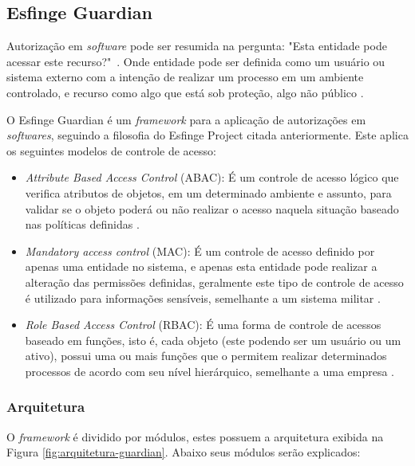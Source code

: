 \subsection{Esfinge Guardian}

\par Autorização em \textit{software} pode ser resumida na pergunta: "Esta entidade pode acessar este recurso?"\ \cite{sandhu1994access}. Onde entidade pode ser definida como um usuário ou sistema externo com a intenção de realizar um processo em um ambiente controlado, e recurso como algo que está sob proteção, algo não público \cite{bartsch2011authorization}.
\par O Esfinge Guardian é um \textit{framework} para a aplicação de autorizações em \textit{softwares}, seguindo a filosofia do Esfinge Project citada anteriormente. Este aplica os seguintes modelos de controle de acesso:

\begin{itemize}
    \item \textit{Attribute Based Access Control} (ABAC): É um controle de acesso lógico que verifica atributos de objetos, em um determinado ambiente e assunto, para validar se o objeto poderá ou não realizar o acesso naquela situação baseado nas políticas definidas \cite{hu2015attribute}.
    
    \item \textit{Mandatory access control} (MAC): É um controle de acesso definido por apenas uma entidade no sistema, e apenas esta entidade pode realizar a alteração das permissões definidas, geralmente este tipo de controle de acesso é utilizado para informações sensíveis, semelhante a um sistema militar \cite{lindqvist2006mandatory}.
    \item \textit{Role Based Access Control} (RBAC): É uma forma de controle de acessos baseado em funções, isto é, cada objeto (este podendo ser um usuário ou um ativo), possui uma ou mais funções que o permitem realizar determinados processos de acordo com seu nível hierárquico, semelhante a uma empresa \cite{sandhu2000nist}.
\end{itemize}

\subsubsection{Arquitetura}

\par O \textit{framework} é dividido por módulos, estes possuem a arquitetura exibida na Figura \ref{fig:arquitetura-guardian}. Abaixo seus módulos serão explicados:

